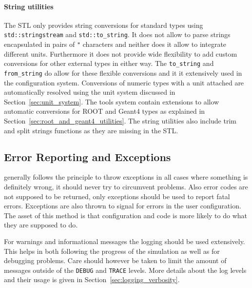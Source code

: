 \paragraph{String utilities}
\label{sec:string_utilities}
The STL only provides string conversions for standard types using \texttt{std::stringstream} and \texttt{std::to\_string}.
It does not allow to parse strings encapsulated in pairs of \texttt{"} characters and neither does it allow to integrate different units.
Furthermore it does not provide wide flexibility to add custom conversions for other external types in either way.
The \apsq \texttt{to\_string} and \texttt{from\_string} do allow for these flexible conversions and it it extensively used in the configuration system.
Conversions of numeric types with a unit attached are automatically resolved using the unit system discussed in Section~\ref{sec:unit_system}.
The \apsq tools system contain extensions to allow automatic conversions for ROOT and Geant4 types as explained in Section~\ref{sec:root_and_geant4_utilities}.
The string utilities also include trim and split strings functions as they are missing in the STL.

\subsection{Error Reporting and Exceptions}
\label{sec:error_reporting_exceptions}
\apsq generally follows the principle to throw exceptions in all cases where something is definitely wrong, it should never try to circumvent problems.
Also error codes are not supposed to be returned, only exceptions should be used to report fatal errors.
Exceptions are also thrown to signal for errors in the user configuration.
The asset of this method is that configuration and code is more likely to do what they are supposed to do.

For warnings and informational messages the logging should be used extensively.
This helps in both following the progress of the simulation as well as for debugging problems.
Care should however be taken to limit the amount of messages outside of the \texttt{DEBUG} and \texttt{TRACE} levels.
More details about the log levels and their usage is given in Section~\ref{sec:logging_verbosity}.

